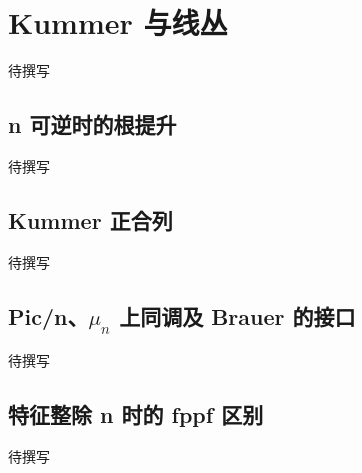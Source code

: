 
% 
% 

\section{Kummer 与线丛}
\label{g5:sec:3503}

待撰写

\subsection{n 可逆时的根提升}
\label{g5:subsec:3503:01}
待撰写

\subsection{Kummer 正合列}
\label{g5:subsec:3503:02}
待撰写

\subsection{\texorpdfstring{Pic/n、\(\mu_n\) 上同调及 Brauer 的接口}{Pic/n、\GeometryPdfMu{}ₙ 上同调及 Brauer 的接口}}
\label{g5:subsec:3503:03}
待撰写

\subsection{特征整除 n 时的 fppf 区别}
\label{g5:subsec:3503:04}
待撰写
